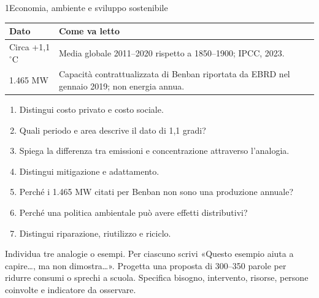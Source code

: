 \begin{lettura}{1}{Economia, ambiente e sviluppo sostenibile}
\begin{center}\begin{minipage}{\linewidth}\centering\small
\begin{tabularx}{\linewidth}{lX}\toprule
Dato & Come va letto\\\midrule
Circa +1,1 $^{\circ}$C & Media globale 2011--2020 rispetto a 1850--1900; IPCC, 2023.\\
1.465 MW & Capacità contrattualizzata di Benban riportata da EBRD nel gennaio 2019; non energia annua.\\\bottomrule
\end{tabularx}
\end{minipage}\end{center}


\attivita
\begin{enumerate}

\item Distingui costo privato e costo sociale.

\item Quali periodo e area descrive il dato di 1,1 gradi?

\item Spiega la differenza tra emissioni e concentrazione attraverso l’analogia.

\item Distingui mitigazione e adattamento.

\item Perché i 1.465 MW citati per Benban non sono una produzione annuale?

\item Perché una politica ambientale può avere effetti distributivi?

\item Distingui riparazione, riutilizzo e riciclo.

\end{enumerate}
\lessico








\lingua
Individua tre analogie o esempi. Per ciascuno scrivi «Questo esempio aiuta a capire…, ma non dimostra…».
\scrittura
Progetta una proposta di 300--350 parole per ridurre consumi o sprechi a scuola. Specifica bisogno, intervento, risorse, persone coinvolte e indicatore da osservare.

\end{lettura}


